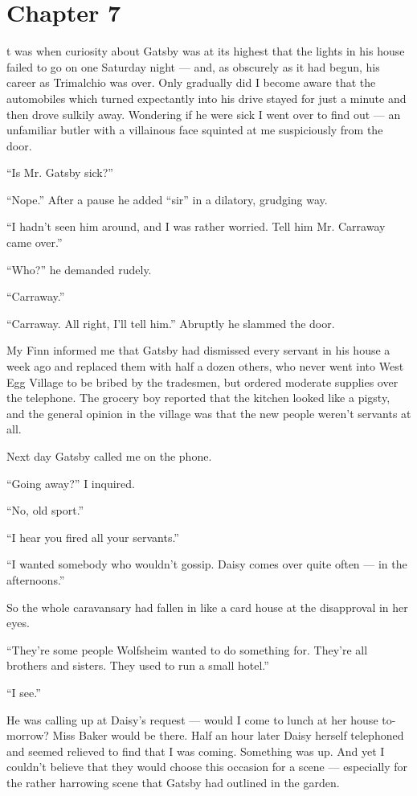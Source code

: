 \documentclass{znotebook}
\begin{document}
\chapter{Chapter 7}

\lettrine[findent=2pt]{}{ }t was when curiosity about Gatsby was at its highest that the lights in his house failed to go on one Saturday night ---{} and, as obscurely as it had begun, his career as Trimalchio was over. Only gradually did I become aware that the automobiles which turned expectantly into his drive stayed for just a minute and then drove sulkily away. Wondering if he were sick I went over to find out ---{} an unfamiliar butler with a villainous face squinted at me suspiciously from the door.

``Is Mr. Gatsby sick?''

``Nope.'' After a pause he added ``sir'' in a dilatory, grudging way.

``I hadn't seen him around, and I was rather worried. Tell him Mr. Carraway came over.''

``Who?'' he demanded rudely.

``Carraway.''

``Carraway. All right, I'll tell him.'' Abruptly he slammed the door.

My Finn informed me that Gatsby had dismissed every servant in his house a week ago and replaced them with half a dozen others, who never went into West Egg Village to be bribed by the tradesmen, but ordered moderate supplies over the telephone. The grocery boy reported that the kitchen looked like a pigsty, and the general opinion in the village was that the new people weren't servants at all.

Next day Gatsby called me on the phone.

``Going away?'' I inquired.

``No, old sport.''

``I hear you fired all your servants.''

``I wanted somebody who wouldn't gossip. Daisy comes over quite often ---{} in the afternoons.''

So the whole caravansary had fallen in like a card house at the disapproval in her eyes.

``They're some people Wolfsheim wanted to do something for. They're all brothers and sisters. They used to run a small hotel.''

``I see.''

He was calling up at Daisy's request ---{} would I come to lunch at her house to-morrow? Miss Baker would be there. Half an hour later Daisy herself telephoned and seemed relieved to find that I was coming. Something was up. And yet I couldn't believe that they would choose this occasion for a scene ---{} especially for the rather harrowing scene that Gatsby had outlined in the garden.
\end{document}
